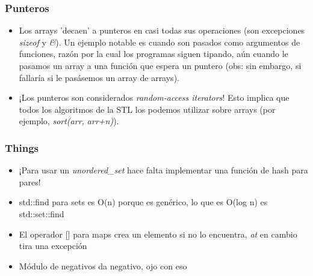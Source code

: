 \subsubsection*{Punteros}

\begin{itemize}
    \item Los arrays 'decaen' a punteros en casi todas sus operaciones (son excepciones \textit{sizeof} y \textit{\&}). Un ejemplo notable es cuando son pasados como argumentos de funciones, razón por la cual los programas siguen tipando, aún cuando le pasamos un array a una función que espera un puntero (obs: sin embargo, si fallaría si le pasásemos un array de arrays).
    \item ¡Los punteros son considerados \textit{random-access iterators}! Esto implica que todos los algoritmos de la STL los podemos utilizar sobre arrays (por ejemplo, \textit{sort(arr, arr+n)}).
\end{itemize}

\subsubsection*{Things}

\begin{itemize}
    \item ¡Para usar un \textit{unordered\_set} hace falta implementar una función de hash para pares!
    \item std::find para sets es O(n) porque es genérico, lo que es O(log n) es std::set::find
    \item El operador [] para maps crea un elemento si no lo encuentra, \textit{at} en cambio tira una excepción
    \item Módulo de negativos da negativo, ojo con eso
\end{itemize}
